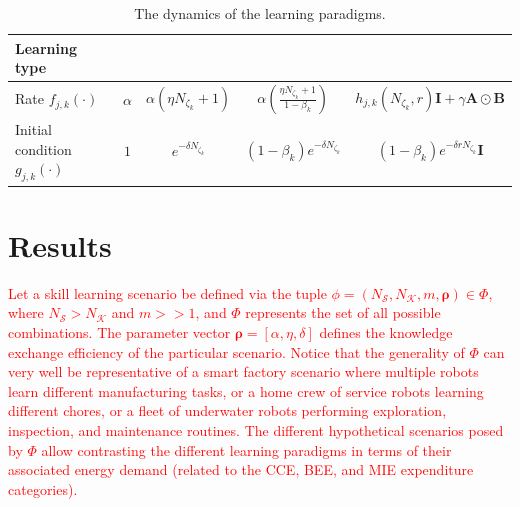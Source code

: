 \documentclass[12pt]{article}
\newcommand\myhl[1]{\textcolor{red}{#1}}
\begin{document}
\begin{table}[!ht]
\caption{The dynamics of the learning paradigms.\label{tab:learning_paradigms_expressions}}
\begin{center}
\begin{adjustbox}{width=\textwidth}
\begin{tabular}{|l||*{4}{c|}}\hline
	Learning type
	&\makebox[3em]{IsL}&\makebox[3em]{IL}&\makebox[3em]{TIL}
	&\makebox[3em]{CL}\\\hline\hline
	Rate $f_{j,k}\left(\cdot \right)$  &$ \alpha$ & $ \alpha\left(\eta N_{\zeta_k} + 1 \right)$ & $\alpha \left( \frac{\eta N_{\zeta_k} + 1}{1 - \beta_k} \right)$ & $h_{j,k}\left(N_{\zeta_k},r\right) \bm{I} + \gamma \bm{A} \odot \bm{B}$ \\\hline
	Initial condition $g_{j,k}\left(\cdot \right)$ &$1$ & $e^{-\delta N_{\zeta_k}}$ & $(1-\beta_k) e^{-\delta N_{\zeta_k}}$ & $(1-\beta_k) e^{-\delta r N_{\zeta_k}} \bm{I}$ \\\hline
\end{tabular}
\end{adjustbox}
\end{center}	
\end{table}
\section*{Results}\label{sec_use_case}
\myhl{Let a skill learning scenario be defined via the tuple $\phi = \left(N_\mathcal{S}, N_\mathcal{K}, m, \bm{\rho} \right) \in \Phi$, where $N_\mathcal{S} > N_\mathcal{K}$ and $m >> 1$, and $\Phi$ represents the set of all possible combinations. The parameter vector $\bm{\rho} = \left[\alpha, \eta, \delta\right]$ defines the knowledge exchange efficiency of the particular scenario. Notice that the generality of $\Phi$ can very well be representative of a smart factory scenario where multiple robots learn different manufacturing tasks, or a home crew of service robots learning different chores, or a fleet of underwater robots performing exploration, inspection, and maintenance routines. The different hypothetical scenarios posed by $\Phi$ allow contrasting the different learning paradigms in terms of their associated energy demand (related to the CCE, BEE, and MIE expenditure categories).}
	
\end{document}
